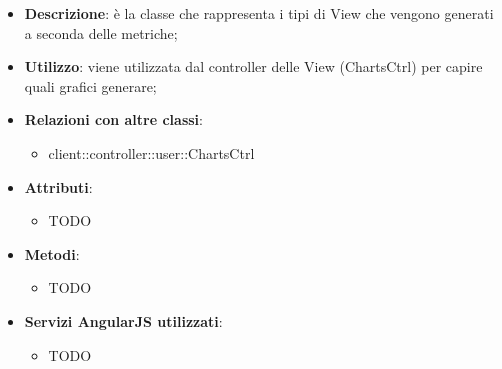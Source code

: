 			\begin{itemize}
				\item \textbf{Descrizione}: è la classe che rappresenta i tipi di View che vengono generati a seconda delle metriche;
				\item \textbf{Utilizzo}: viene utilizzata dal controller delle View (ChartsCtrl) per capire quali grafici generare;
				\item \textbf{Relazioni con altre classi}:
					\begin{itemize}
						\item client::controller::user::ChartsCtrl
					\end{itemize}

				\item \textbf{Attributi}:
					\begin{itemize}
						\item TODO
					\end{itemize}

				\item \textbf{Metodi}:
					\begin{itemize}
						\item TODO
					\end{itemize}

				\item \textbf{Servizi AngularJS utilizzati}:
					\begin{itemize}
						\item TODO
					\end{itemize}

			\end{itemize}

